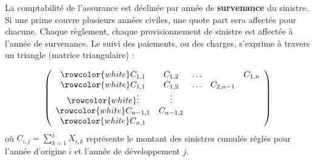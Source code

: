 \begin{f}
	
	La comptabilité de l'assurance est déclinée par année de \textbf{survenance} du sinistre. 
	Si une prime couvre plusieurs années civiles, une quote part sera affectée pour chacune.
	Chaque règlement, chaque provisionnement de sinistre est affectée à l'année de survenance. 
	Le suivi des paiements, ou des charges, s'exprime à travers  un triangle (matrice triangulaire) :
	
	$$
	\left(\begin{array}{ccccc}
		\rowcolor{white}	C_{1,1} & C_{1,2} & \ldots & & C_{1, n} \\
		\rowcolor{white}	C_{1,1} & C_{1,2} & \ldots & C_{2, n-1} \\
		\rowcolor{white}	\vdots & \vdots & & \\
		\rowcolor{white}	C_{n-1,1} & C_{n-1,2} & & \\
		\rowcolor{white}	C_{n, 1} & & &
	\end{array}\right)
	$$
	où $C_{i, j}=\sum_{k=1}^{j} X_{i, k}$ représente le montant des sinistres cumulés  réglés pour l'année d'origine $i$ et l'année de développement $j$.
	
\end{f}


